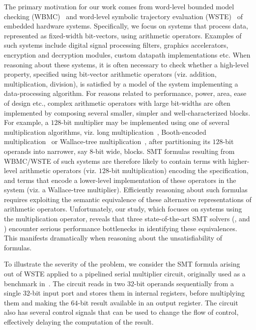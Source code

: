 The primary motivation for our work comes from word-level bounded
model checking (WBMC)~\cite{cbmc,hwcbmc} and word-level symbolic
trajectory evaluation (WSTE)~\cite{wste} of embedded hardware systems.
Specifically, we focus on systems that process data, represented as
fixed-width bit-vectors, using arithmetic operators.  Examples of such
systems include digital signal processing filters, graphics
accelerators, encryption and decryption modules, custom datapath
implementations etc.  When reasoning about these systems, it is often
necessary to check whether a high-level property, specified using
bit-vector arithmetic operators (viz. addition, multiplication,
division), is satisfied by a model of the system implementing a
data-processing algorithm.  For reasons related to performance, power,
area, ease of design etc., complex arithmetic operators with large
bit-widths are often implemented by composing several smaller, simpler
and well-characterized blocks.  For example, a $128$-bit multiplier
may be implemented using one of several multiplication algorithms,
viz. long multiplication~\cite{long}, Booth-encoded
multiplication~\cite{booth} or Wallace-tree
multiplication~\cite{wallace}, after partitioning its $128$-bit
operands into narrower, say $8$-bit wide, blocks.  SMT formulas
resulting from WBMC/WSTE of such systems are therefore likely to
contain terms with higher-level arithmetic operators (viz. $128$-bit
multiplication) encoding the specification, and terms that encode a
lower-level implementation of these operators in the system (viz. a
Wallace-tree multiplier).  Efficiently reasoning about such formulas
requires exploiting the semantic equivalence of these alternative
representations of arithmetic operators.  Unfortunately, our study,
which focuses on systems using the multiplication operator, reveals
that three state-of-the-art SMT solvers ({\zthree}, {\cvcfour} and
{\boolector}) encounter serious performance bottlenecks in identifying
these equivalences.  This manifests dramatically when reasoning about
the unsatisfiability of formulas.

 \newpage
 
 To illustrate
the severity of the problem, we consider the SMT formula arising out
of WSTE applied to a pipelined serial multiplier circuit, originally
used as a benchmark in~\cite{wste}.  The circuit reads in two $32$-bit
operands sequentially from a single $32$-bit input port and stores
them in internal registers, before multiplying them and making the
$64$-bit result available in an output register.  The circuit also has
several control signals that can be used to change the flow of
control, effectively delaying the computation of the result.

